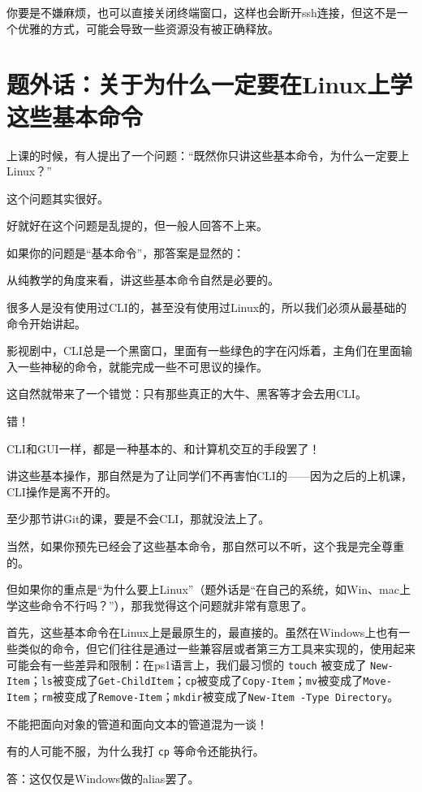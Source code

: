 \documentclass[12pt]{ctexart}
\begin{document}
你要是不嫌麻烦，也可以直接关闭终端窗口，这样也会断开ssh连接，但这不是一个优雅的方式，可能会导致一些资源没有被正确释放。

\section{题外话：关于为什么一定要在Linux上学这些基本命令}

上课的时候，有人提出了一个问题：“既然你只讲这些基本命令，为什么一定要上Linux？”

这个问题其实很好。

好就好在这个问题是乱提的，但一般人回答不上来。

如果你的问题是“基本命令”，那答案是显然的：

从纯教学的角度来看，讲这些基本命令自然是必要的。

很多人是没有使用过CLI的，甚至没有使用过Linux的，所以我们必须从最基础的命令开始讲起。

影视剧中，CLI总是一个黑窗口，里面有一些绿色的字在闪烁着，主角们在里面输入一些神秘的命令，就能完成一些不可思议的操作。

这自然就带来了一个错觉：只有那些真正的大牛、黑客等才会去用CLI。

错！

CLI和GUI一样，都是一种基本的、和计算机交互的手段罢了！

讲这些基本操作，那自然是为了让同学们不再害怕CLI的——因为之后的上机课，CLI操作是离不开的。

至少那节讲Git的课，要是不会CLI，那就没法上了。

当然，如果你预先已经会了这些基本命令，那自然可以不听，这个我是完全尊重的。

但如果你的重点是“为什么要上Linux”（题外话是“在自己的系统，如Win、mac上学这些命令不行吗？”），那我觉得这个问题就非常有意思了。

首先，这些基本命令在Linux上是最原生的，最直接的。虽然在Windows上也有一些类似的命令，但它们往往是通过一些兼容层或者第三方工具来实现的，使用起来可能会有一些差异和限制：在ps1语言上，我们最习惯的 \texttt{touch} 被变成了 \texttt{New-Item}；\texttt{ls}被变成了\texttt{Get-ChildItem}；\texttt{cp}被变成了\texttt{Copy-Item}；\texttt{mv}被变成了\texttt{Move-Item}；\texttt{rm}被变成了\texttt{Remove-Item}；\texttt{mkdir}被变成了\texttt{New-Item -Type Directory}。

不能把面向对象的管道和面向文本的管道混为一谈！

有的人可能不服，为什么我打 \texttt{cp} 等命令还能执行。

答：这仅仅是Windows做的alias罢了。
\end{document}
